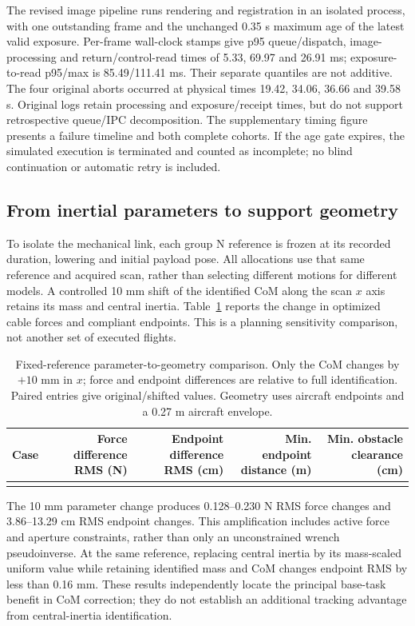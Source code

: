 The revised image pipeline runs rendering and registration in an isolated process, with one outstanding frame and the unchanged 0.35 s maximum age of the latest valid exposure. Per-frame wall-clock stamps give p95 queue/dispatch, image-processing and return/control-read times of 5.33, 69.97 and 26.91 ms; exposure-to-read p95/max is 85.49/111.41 ms. Their separate quantiles are not additive. The four original aborts occurred at physical times 19.42, 34.06, 36.66 and 39.58 s. Original logs retain processing and exposure/receipt times, but do not support retrospective queue/IPC decomposition. The supplementary timing figure presents a failure timeline and both complete cohorts. If the age gate expires, the simulated execution is terminated and counted as incomplete; no blind continuation or automatic retry is included.

\subsection{From inertial parameters to support geometry}
To isolate the mechanical link, each group N reference is frozen at its recorded duration, lowering and initial payload pose. All allocations use that same reference and acquired scan, rather than selecting different motions for different models. A controlled 10 mm shift of the identified CoM along the scan $x$ axis retains its mass and central inertia. Table~\ref{tab:forcegeometry} reports the change in optimized cable forces and compliant endpoints. This is a planning sensitivity comparison, not another set of executed flights.

\begin{table}[t]
\centering\small
\caption{Fixed-reference parameter-to-geometry comparison. Only the CoM changes by $+10$ mm in $x$; force and endpoint differences are relative to full identification. Paired entries give original/shifted values. Geometry uses aircraft endpoints and a 0.27 m aircraft envelope.}
\label{tab:forcegeometry}
\begin{tabular}{@{}lrrrr@{}}\toprule
Case & Force difference RMS (N) & Endpoint difference RMS (cm) & Min. endpoint distance (m) & Min. obstacle clearance (cm)\\\midrule
\\\bottomrule
\end{tabular}
\end{table}

The 10 mm parameter change produces 0.128--0.230 N RMS force changes and 3.86--13.29 cm RMS endpoint changes. This amplification includes active force and aperture constraints, rather than only an unconstrained wrench pseudoinverse. At the same reference, replacing central inertia by its mass-scaled uniform value while retaining identified mass and CoM changes endpoint RMS by less than 0.16 mm. These results independently locate the principal base-task benefit in CoM correction; they do not establish an additional tracking advantage from central-inertia identification.

